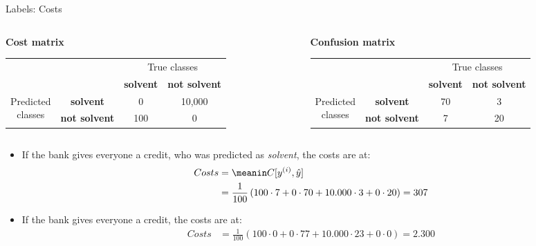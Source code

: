 \begin{vbframe}{Labels: Costs}

\begin{columns}
\begin{column}{0.5\textwidth} 
\footnotesize\textbf{Cost matrix}
 \begin{table}[ht]
 \tiny
\begin{center}
\begin{tabular}{cccc}
    \hline
    & &\multicolumn{2}{c}{True classes} \\ 
    & &\textbf{solvent} & \textbf{not solvent}  \\ 
 \hline
    \multirow{2}{*}{\parbox{0.5cm}{Predicted \\ classes}}& \textbf{solvent}     & 0                 & 10,000\\
    & \textbf{not solvent} & 100               & 0\\
    \hline
\end{tabular}
\end{center}
\end{table}
\end{column}

\begin{column}{0.5\textwidth}
\footnotesize\textbf{Confusion matrix}
 \begin{table}[ht]
 \tiny
\begin{center}
\begin{tabular}{cccc}
    \hline
    & &\multicolumn{2}{c}{True classes} \\ 
    & &\textbf{solvent} & \textbf{not solvent}  \\ 
 \hline
    \multirow{2}{*}{\parbox{0.5cm}{Predicted \\ classes}}& \textbf{solvent}     & 70                 & 3\\
    & \textbf{not solvent} & 7              & 20\\
    \hline
\end{tabular}
\end{center}
\end{table}
\end{column}
\end{columns}


  \begin{itemize}
      \item If the bank gives everyone a credit, who was predicted as \textit{solvent}, the costs are at:
      \begin{align*}
      Costs &= \meanin C[\yi, \yih] \\&= 
      \frac{1}{100} \left( 
      100 \cdot 7 + 
      0 \cdot 70 + 
      10.000 \cdot 3 +
      0 \cdot 20 
      \right) = 307
      \end{align*}
    \item If the bank gives everyone a credit, the costs are at:
      \begin{align*}
      Costs &= 
      \frac{1}{100} \left( 
      100 \cdot 0 + 
      0 \cdot 77 + 
      10.000 \cdot 23 +
      0 \cdot 0 
      \right) = 2.300
      \end{align*}
    

\end{itemize}
\end{vbframe}
